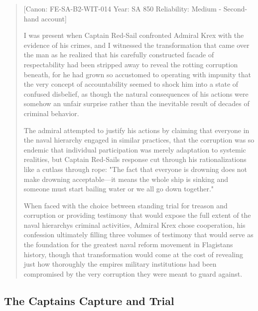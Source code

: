 \begin{quote}
{[}Canon: FE-SA-B2-WIT-014 \textbar{} Year: SA 850 \textbar{}
Reliability: Medium - Second-hand account{]}

I was present when Captain Red-Sail confronted Admiral Krex with the
evidence of his crimes, and I witnessed the transformation that came
over the man as he realized that his carefully constructed facade of
respectability had been stripped away to reveal the rotting corruption
beneath, for he had grown so accustomed to operating with impunity that
the very concept of accountability seemed to shock him into a state of
confused disbelief, as though the natural consequences of his actions
were somehow an unfair surprise rather than the inevitable result of
decades of criminal behavior.

The admiral attempted to justify his actions by claiming that everyone
in the naval hierarchy engaged in similar practices, that the corruption
was so endemic that individual participation was merely adaptation to
systemic realities, but Captain Red-Sail\textquotesingle s response cut
through his rationalizations like a cutlass through rope: "The fact that
everyone is drowning does not make drowning acceptable---it means the
whole ship is sinking and someone must start bailing water or we all go
down together."

When faced with the choice between standing trial for treason and
corruption or providing testimony that would expose the full extent of
the naval hierarchy\textquotesingle s criminal activities, Admiral Krex
chose cooperation, his confession ultimately filling three volumes of
testimony that would serve as the foundation for the greatest naval
reform movement in Flagistan\textquotesingle s history, though that
transformation would come at the cost of revealing just how thoroughly
the empire\textquotesingle s military institutions had been compromised
by the very corruption they were meant to guard against.
\end{quote}

\subsection{The Captain\textquotesingle s Capture and
Trial}\label{the-captains-capture-and-trial}

